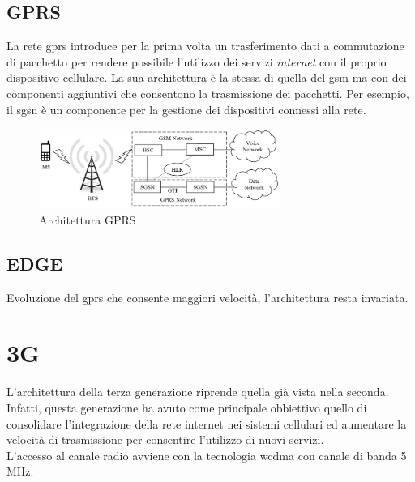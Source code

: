 \clearpage

\subsection{GPRS}
La rete \gls{gprs}\cite{gprs-edge} introduce per la prima volta un trasferimento dati a commutazione di pacchetto per rendere 
possibile l'utilizzo dei servizi \textit{internet} con il proprio dispositivo cellulare\cite{gsm-architecture}.
La sua architettura è la stessa di quella del \gls{gsm} ma con dei componenti aggiuntivi che consentono la trasmissione dei pacchetti. 
Per esempio, il \gls{sgsn} è un componente per la gestione dei dispositivi connessi alla rete.
\begin{figure}[ht]
    \centering
    \includegraphics[width=0.7\textwidth]{images/2g-gprs.png}
    \caption{Architettura GPRS}
\end{figure}
\subsection{EDGE}
Evoluzione del \gls{gprs} che consente maggiori velocità, l'architettura resta invariata\cite{gprs-edge}.

\clearpage

\section{3G}
L'architettura della terza generazione riprende quella già vista nella seconda. Infatti, questa generazione ha avuto come principale obbiettivo 
quello di consolidare l'integrazione della rete internet nei sistemi cellulari ed aumentare la velocità di trasmissione per consentire l'utilizzo 
di nuovi servizi.\\
L'accesso al canale radio avviene con la tecnologia \gls{wcdma} con canale di banda 5 MHz.

